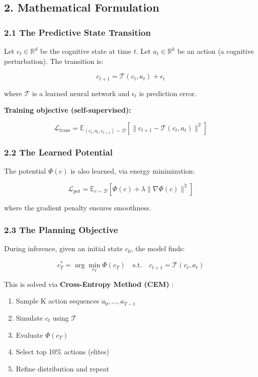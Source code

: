 \documentclass[
  11pt,
  a4paper,
]{article}
\providecommand{\tightlist}{%
  \setlength{\itemsep}{0pt}\setlength{\parskip}{0pt}}
\begin{document}
\subsection{2. Mathematical Formulation}\label{mathematical-formulation}

\subsubsection{2.1 The Predictive State
Transition}\label{the-predictive-state-transition}

Let \(c_t \in \mathbb{R}^d\) be the cognitive state at time \(t\). Let
\(a_t \in \mathbb{R}^k\) be an action (a cognitive perturbation). The
transition is:

\[c_{t+1} = \mathcal{T}(c_t, a_t) + \epsilon_t\]

where \(\mathcal{T}\) is a learned neural network and \(\epsilon_t\) is
prediction error.

\textbf{Training objective (self-supervised):}

\[\mathcal{L}_{\text{trans}} = \mathbb{E}_{(c_t, a_t, c_{t+1}) \sim \mathcal{D}} \left[ \|c_{t+1} - \mathcal{T}(c_t, a_t)\|^2 \right]\]

\subsubsection{2.2 The Learned Potential}\label{the-learned-potential}

The potential \(\Phi(c)\) is also learned, via energy minimization:

\[\mathcal{L}_{\text{pot}} = \mathbb{E}_{c \sim \mathcal{D}} \left[ \Phi(c) + \lambda \|\nabla \Phi(c)\|^2 \right]\]

where the gradient penalty ensures smoothness.

\subsubsection{2.3 The Planning Objective}\label{the-planning-objective}

During inference, given an initial state \(c_0\), the model finds:

\[c_T^* = \arg\min_{c_T} \Phi(c_T) \quad \text{s.t.} \quad c_{t+1} = \mathcal{T}(c_t, a_t)\]

This is solved via \textbf{Cross-Entropy Method (CEM)} :

\begin{enumerate}
\def\labelenumi{\arabic{enumi}.}
\tightlist
\item
  Sample K action sequences \(a_0, \dots, a_{T-1}\)
\item
  Simulate \(c_t\) using \(\mathcal{T}\)
\item
  Evaluate \(\Phi(c_T)\)
\item
  Select top 10\% actions (elites)
\item
  Refine distribution and repeat
\end{enumerate}
\end{document}
